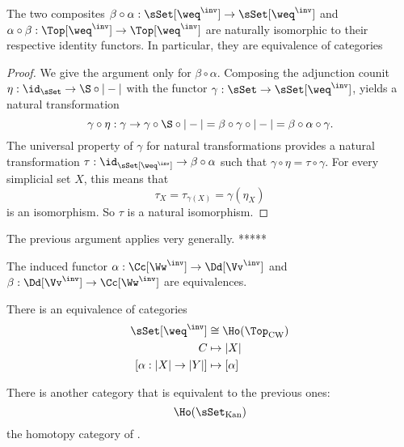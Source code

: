 \begin{theorem}
The two composites $\beta\circ\alpha:\sSet[\weq^\inv]\to\sSet[\weq^\inv]$ and $\alpha\circ\beta:\Top[\weq^\inv]\to\Top[\weq^\inv]$ are naturally isomorphic to their respective identity functors. In particular, they are equivalence of categories
\end{theorem}

\begin{proof}
We give the argument only for $\beta\circ\alpha$. Composing the adjunction counit $\eta:\id_\sSet\to\S\circ|-|$ with the functor $\gamma:\sSet\to\sSet[\weq^\inv]$, yields a natural transformation
\[\gamma\circ\eta:\gamma\to\gamma\circ\S\circ|-|=\beta\circ\gamma\circ|-|=\beta\circ\alpha\circ\gamma.\]
The universal property of $\gamma$ for natural transformations provides a natural transformation $\tau:\id_{\sSet[\weq^\inv]}\to\beta\circ\alpha$ such that $\gamma\circ\eta=\tau\circ\gamma$. For every simplicial set $X$, this means that
\[\tau_X=\tau_{\gamma(X)}=\gamma(\eta_X)\]
is an isomorphism. So $\tau$ is a natural isomorphism.
\end{proof}

The previous argument applies very generally. *****

\begin{theorem}
The induced functor $\alpha:\Cc[\Ww^\inv]\to\Dd[\Vv^\inv]$ and $\beta:\Dd[\Vv^\inv]\to\Cc[\Ww^\inv]$ are equivalences.
\end{theorem}

\begin{corollary}
There is an equivalence of categories
\begin{align*}
    \sSet[\weq^\inv]&\cong\Ho(\Top_\text{CW})\\
    C&\mapsto|X|\\
    [\alpha:|X|\to|Y|]&\mapsto[\alpha]
\end{align*}
\end{corollary}

\begin{remark}
There is another category that is equivalent to the previous ones:
\[\Ho(\sSet_\text{Kan})\]
the homotopy category of .
\end{remark}













